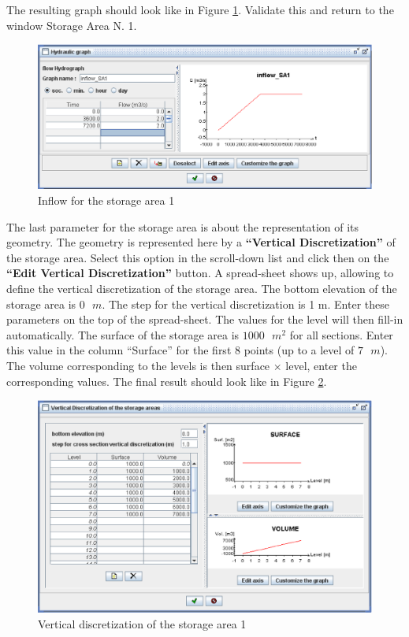 \documentclass[a4paper,12pt]{article}
\begin{document}
The resulting graph should look like in Figure \ref{fig:InflowSA1}.
Validate this and return to the window Storage Area N. 1.

\begin{figure}[h]
  \begin{center}
  \includegraphics[scale=0.5]{inflow_sa1}
  \caption{Inflow for the storage area 1}
  \label{fig:InflowSA1}
  \end{center}
\end{figure}


The last parameter for the storage area is about the representation
of its geometry. The geometry is represented here by a \textbf{{}``Vertical
Discretization''} of the storage area. Select this option in the
scroll-down list and click then on the \textbf{{}``Edit Vertical
Discretization''} button. A spread-sheet shows up, allowing to
define the vertical discretization of the storage area. The bottom
elevation of the storage area is $0\mbox{ }m$. The step for the vertical discretization
is 1 m. Enter these parameters on the top of the spread-sheet. The
values for the level will then fill-in automatically. The surface
of the storage area is $1000\mbox{ }m^2$ for all sections.
Enter this value in the column {}``Surface'' for the first 8 points
(up to a level of $7\mbox{ }m$). The volume corresponding to the levels is then
surface $\times$ level, enter the corresponding values. The final result
should look like in Figure \ref{fig:Vertical-discretization-SA1}.

\begin{figure}[h]
  \begin{center}
  \includegraphics[scale=0.5]{disc_SA1}
  \caption{Vertical discretization of the storage area 1}
  \label{fig:Vertical-discretization-SA1}
  \end{center}
\end{figure}
\end{document}
